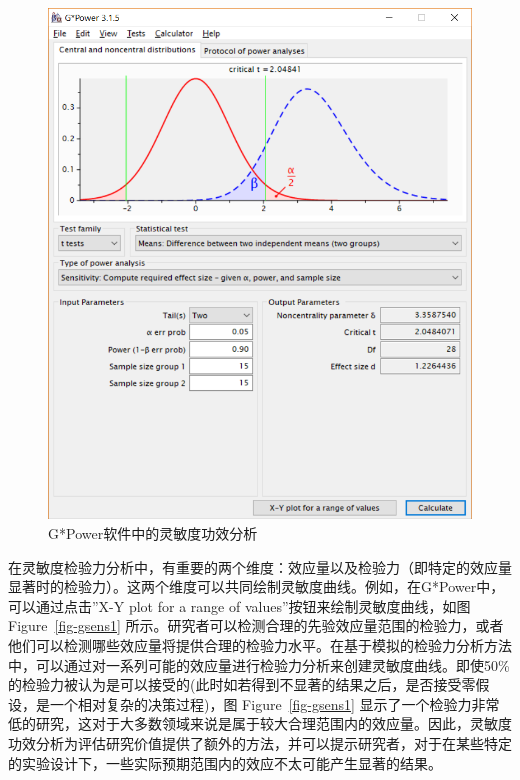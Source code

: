 \documentclass[
  letterpaper,
  DIV=11,
  numbers=noendperiod]{scrreprt}
\begin{document}
\begin{figure}

{\centering \includegraphics[width=1\textwidth,height=\textheight]{images/gpow_sensitivity_1.png}

}

\caption{\label{fig-gsens0}G*Power软件中的灵敏度功效分析}

\end{figure}

在灵敏度检验力分析中，有重要的两个维度：效应量以及检验力（即特定的效应量显著时的检验力）。这两个维度可以共同绘制灵敏度曲线。例如，在G*Power中，可以通过点击''X-Y
plot for a range of values''按钮来绘制灵敏度曲线，如图
Figure~\ref{fig-gsens1}
所示。研究者可以检测合理的先验效应量范围的检验力，或者他们可以检测哪些效应量将提供合理的检验力水平。在基于模拟的检验力分析方法中，可以通过对一系列可能的效应量进行检验力分析来创建灵敏度曲线。即使50\%的检验力被认为是可以接受的(此时如若得到不显著的结果之后，是否接受零假设，是一个相对复杂的决策过程)，图
Figure~\ref{fig-gsens1}
显示了一个检验力非常低的研究，这对于大多数领域来说是属于较大合理范围内的效应量。因此，灵敏度功效分析为评估研究价值提供了额外的方法，并可以提示研究者，对于在某些特定的实验设计下，一些实际预期范围内的效应不太可能产生显著的结果。
\end{document}
